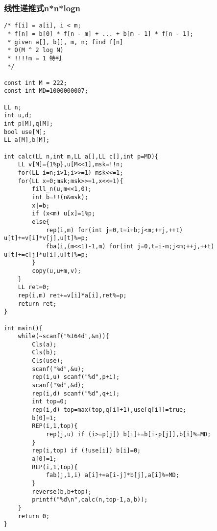 \subsubsection{线性递推式n*n*logn}
\begin{verbatim}
/* f[i] = a[i], i < m; 
 * f[n] = b[0] * f[n - m] + ... + b[m - 1] * f[n - 1]; 
 * given a[], b[], m, n; find f[n]
 * O(M ^ 2 log N) 
 * !!!!m = 1 特判
 */

const int M = 222;
const int MD=1000000007;

LL n;
int u,d;
int p[M],q[M];
bool use[M];
LL a[M],b[M];

int calc(LL n,int m,LL a[],LL c[],int p=MD){
    LL v[M]={1%p},u[M<<1],msk=!!n;
    for(LL i=n;i>1;i>>=1) msk<<=1;
    for(LL x=0;msk;msk>>=1,x<<=1){
        fill_n(u,m<<1,0);
        int b=!!(n&msk);
        x|=b;
        if (x<m) u[x]=1%p;
        else{
            rep(i,m) for(int j=0,t=i+b;j<m;++j,++t) u[t]+=v[i]*v[j],u[t]%=p;
            fba(i,(m<<1)-1,m) for(int j=0,t=i-m;j<m;++j,++t) u[t]+=c[j]*u[i],u[t]%=p;
        }
        copy(u,u+m,v);
    }
    LL ret=0;
    rep(i,m) ret+=v[i]*a[i],ret%=p;
    return ret;
}

int main(){
    while(~scanf("%I64d",&n)){
        Cls(a);
        Cls(b);
        Cls(use);
        scanf("%d",&u);
        rep(i,u) scanf("%d",p+i);
        scanf("%d",&d);
        rep(i,d) scanf("%d",q+i);
        int top=0;
        rep(i,d) top=max(top,q[i]+1),use[q[i]]=true;
        b[0]=1;
        REP(i,1,top){
            rep(j,u) if (i>=p[j]) b[i]+=b[i-p[j]],b[i]%=MD;
        }
        rep(i,top) if (!use[i]) b[i]=0;
        a[0]=1;
        REP(i,1,top){
            fab(j,1,i) a[i]+=a[i-j]*b[j],a[i]%=MD;
        }
        reverse(b,b+top);
        printf("%d\n",calc(n,top-1,a,b));
    }
    return 0;
}
\end{verbatim}

